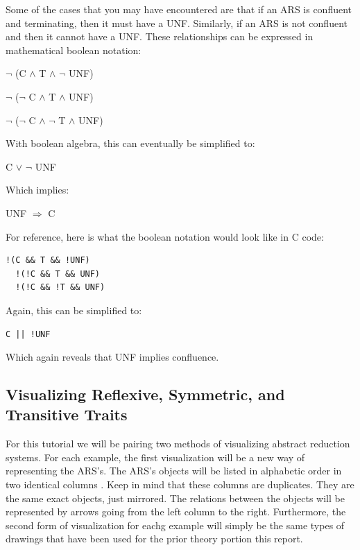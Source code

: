 \documentclass{article}
\begin{document}
\medskip\noindent
Some of the cases that you may have encountered are that if an ARS is confluent and terminating, then it must have a UNF. Similarly, if an ARS is not confluent and then it cannot have a UNF. These relationships can be expressed in mathematical boolean notation:

\medskip
  $\neg$ (C $\land$ T $\land$ $\neg$ UNF)

\medskip
  $\neg$ ($\neg$ C $\land$ T $\land$ UNF)

\medskip
  $\neg$ ($\neg$ C $\land$ $\neg$ T $\land$ UNF)

\medskip\noindent
With boolean algebra, this can eventually be simplified to:

\medskip
  C $\lor$ $\neg$ UNF

\medskip\noindent
Which implies:

\medskip
  UNF $\Rightarrow$ C

\medskip\noindent
For reference, here is what the boolean notation would look like in C code:

\begin{lstlisting}[style=CStyle]
  !(C && T && !UNF)
  !(!C && T && UNF)
  !(!C && !T && UNF)
\end{lstlisting}

\medskip\noindent
Again, this can be simplified to:

\begin{lstlisting}[style=CStyle]
  C || !UNF
\end{lstlisting}

\medskip\noindent
Which again reveals that UNF implies confluence.


\subsection{Visualizing Reflexive, Symmetric, and Transitive Traits}

\medskip\noindent
For this tutorial we will be pairing two methods of visualizing abstract reduction systems. For each example, the first visualization will be a new way of representing the ARS's. The ARS's objects will be listed in alphabetic order in two identical columns \cite{RST}. Keep in mind that these columns are duplicates. They are the same exact objects, just mirrored. The relations between the objects will be represented by arrows going from the left column to the right. Furthermore, the second form of visualization for eachg example will simply be the same types of drawings that have been used for the prior theory portion this report.
\end{document}
